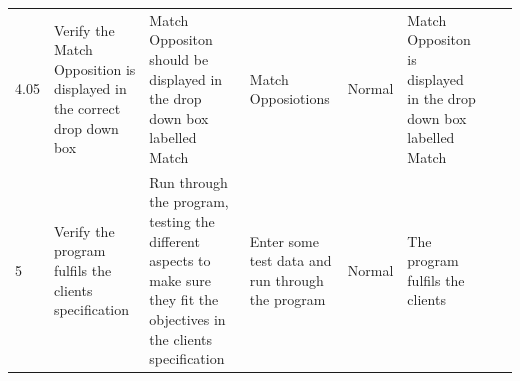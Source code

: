 \begin{table}[]
\begin{tabular}{llllllll}
		4.05                   & Verify the Match Opposition is displayed in the correct drop down box            & Match Oppositon should be displayed in the drop down box labelled Match                                                   & Match Opposiotions                                                    & Normal                                                                  & Match Oppositon is displayed in the drop down box labelled Match                              &               &                      \\
		5                      & Verify the program fulfils the clients specification                             & Run through the program, testing the different aspects to make sure they fit the objectives in the clients specification  & Enter some test data and run through the program                      & Normal                                                                  & The program fulfils the clients                                                               &               &                     
	\end{tabular}
\end{table}
